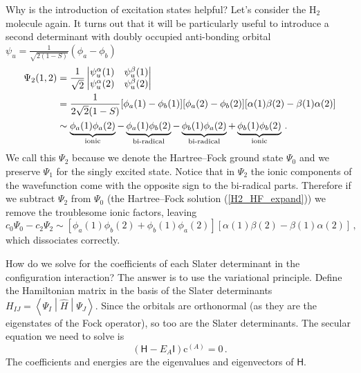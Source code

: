 \documentclass{article}
\theoremstyle{plain}\theoremheaderfont{\normalfont\itshape}\theorembodyfont{\rmfamily}\theoremseparator{.}\newtheorem*{rem}{Remark}\newtheorem*{ex}{Example}\newtheorem*{proof}{Proof}\newtheorem*{altp}{Alternative proof}
\theoremstyle{plain}\theoremheaderfont{\normalfont\bfseries}\theorembodyfont{\rmfamily}\theoremseparator{.}\newtheorem{thm}{Theorem}[section]\newtheorem{lem}[thm]{Lemma}\newtheorem{prop}[thm]{Proposition}\newtheorem*{cor}{Corollary}\newtheorem{defn}[thm]{Definition}\newtheorem{clm}[thm]{Claim}\newtheorem{clminproof}{Claim}\newtheorem{pos}{Postulate}[section]
\theoremstyle{break}\theoremheaderfont{\normalfont\itshape}\theorembodyfont{\rmfamily}\theoremseparator{.\medskip}\newtheorem*{proofskip}{Proof}\newtheorem*{exs}{Examples}\newtheorem*{rems}{Remarks}
\theoremstyle{break}\theoremheaderfont{\normalfont\bfseries}\theorembodyfont{\rmfamily}\theoremseparator{.\medskip}\newtheorem{lemskip}[thm]{Lemma}\newtheorem{defnskip}[thm]{Definition}\newtheorem{propskip}[thm]{Proposition}\newtheorem{thmskip}[thm]{Theorem}
\numberwithin{equation}{section}
\newcommand{\mel}[3]{\left\langle #1 \middle| #2 \middle| #3 \right\rangle}
\newcommand{\vb}[1]{\bm{\mathrm{#1}}}
\begin{document}
    Why is the introduction of excitation states helpful? Let's consider the \(\mathrm{H_2}\) molecule again. It turns out that it will be particularly useful to introduce a second determinant with doubly occupied anti-bonding orbital \(\psi_u=\frac{1}{\sqrt{2(1-S)}}(\phi_a-\phi_b)\)
    \begin{align}
        \Psi_2(1,2)&=\frac{1}{\sqrt{2}}\begin{vmatrix}
            \psi_u^\alpha(1) & \psi_u^\beta(1)\\
            \psi_u^\alpha(2) & \psi_u^\beta(2)
        \end{vmatrix}\notag\\
        &=\frac{1}{2\sqrt{2}(1-S)}[\phi_a(1)-\phi_b(1)][\phi_a(2)-\phi_b(2)][\alpha(1)\beta(2)-\beta(1)\alpha(2)]\notag\\
        &\sim\underbrace{\phi_a(1)\phi_a(2)}_{\text{ionic}}-\underbrace{\phi_a(1)\phi_b(2)}_{\text{bi-radical}}-\underbrace{\phi_b(1)\phi_a(2)}_{\text{bi-radical}}+\underbrace{\phi_b(1)\phi_b(2)}_{\text{ionic}}\,.
    \end{align}
    We call this \(\Psi_2\) because we denote the Hartree--Fock ground state \(\Psi_0\) and we preserve \(\Psi_1\) for the singly excited state. Notice that in \(\Psi_2\) the ionic components of the wavefunction come with the opposite sign to the bi-radical parts. Therefore if we subtract \(\Psi_2\) from \(\Psi_0\) (the Hartree--Fock solution (\ref{H2_HF_expand})) we remove the troublesome ionic factors, leaving
    \begin{equation}
        c_0\Psi_0-c_2\Psi_2\sim[\phi_a(1)\phi_b(2)+\phi_b(1)\phi_a(2)][\alpha(1)\beta(2)-\beta(1)\alpha(2)]\,,
    \end{equation}
    which dissociates correctly.

    How do we solve for the coefficients of each Slater determinant in the configuration interaction? The answer is to use the variational principle. Define the Hamiltonian matrix in the basis of the Slater determinants \(H_{IJ}=\mel{\Psi_I}{\hat{H}}{\Psi_J}\). Since the orbitals are orthonormal (as they are the eigenstates of the Fock operator), so too are the Slater determinants. The secular equation we need to solve is
    \begin{equation}
        (\mathsf{H}-E_A\mathsf{I})\vb{c}^{(A)}=\vb{0}\,.
    \end{equation}
    The coefficients and energies are the eigenvalues and eigenvectors of \(\mathsf{H}\).
\end{document}
